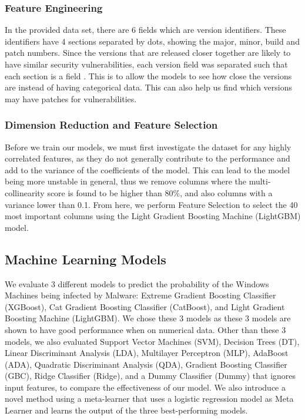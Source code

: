 \documentclass[pdflatex,sn-basic,Numbered]{sn-jnl}%
\theoremstyle{thmstyleone}%
\theoremstyle{thmstyletwo}%
\theoremstyle{thmstylethree}%
\begin{document}
\subsubsection{Feature Engineering} 
In the provided data set, there are 6 fields which are version identifiers. These identifiers have 4 sections separated by dots, showing the major, minor, build and patch numbers. Since the versions that are released closer together are likely to have similar security vulnerabilities, each version field was separated such that each section is a field \cite{iop2020}. This is to allow the models to see how close the versions are instead of having categorical data. This can also help us find which versions may have patches for vulnerabilities.
\subsubsection{Dimension Reduction and Feature Selection}
Before we train our models, we must first investigate the dataset for any highly correlated features, as they do not generally contribute to the performance and add to the variance of the coefficients of the model. This can lead to the model being more unstable in general, thus we remove columns where the multi-collinearity score is found to be higher than 80\%, and also columns with a variance lower than 0.1. From here, we perform Feature Selection to select the 40 most important columns using the Light Gradient Boosting Machine (LightGBM) model.
\subsection{Machine Learning Models}
We evaluate 3 different models to predict the probability of the Windows Machines being infected by Malware: Extreme Gradient Boosting Classifier (XGBoost), Cat Gradient Boosting Classifier (CatBoost), and Light Gradient Boosting Machine (LightGBM). We chose these 3 models as these 3 models are shown to have good performance when on numerical data. Other than these 3 models, we also evaluated Support Vector Machines (SVM), Decision Trees (DT), Linear Discriminant Analysis (LDA), Multilayer Perceptron (MLP), AdaBoost (ADA), Quadratic Discriminant Analysis (QDA), Gradient Boosting Classifier (GBC), Ridge Classifier (Ridge), and a Dummy Classifier (Dummy) that ignores input features, to compare the effectiveness of our model. We also introduce a novel method using a meta-learner that uses a logistic regression model as Meta Learner and learns the output of the three best-performing models.
\end{document}
